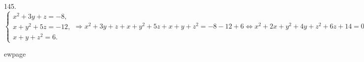 145. $\begin{cases} x^2+3y+z=-8,\\ x+y^2+5z=-12,\\ x+y+z^2=6.\end{cases}\Rightarrow x^2+3y+z+x+y^2+5z+x+y+z^2=-8-12+6 \Leftrightarrow x^2+2x+y^2+4y+z^2+6z+14=0\Leftrightarrow (x+1)^2+(y+2)^2+(z+3)^2=0\Leftrightarrow \begin{cases} x=-1,\\ y=-2,\\ z=-3.\end{cases}$

ewpage
